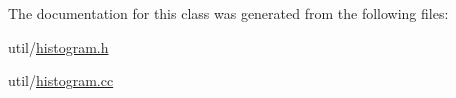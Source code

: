 The documentation for this class was generated from the following files\-:\begin{DoxyCompactItemize}
\item 
util/\hyperlink{histogram_8h}{histogram.\-h}\item 
util/\hyperlink{histogram_8cc}{histogram.\-cc}\end{DoxyCompactItemize}
